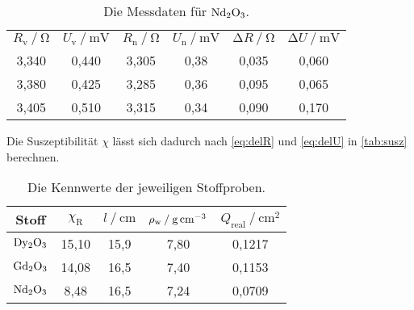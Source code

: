 \begin{table}[H]
  \centering
  \caption{Die Messdaten für $\ce{Nd2O3}$.}
  \label{tab:nd}
  \begin{tabular}{c c c c c c}
    \toprule 
    
    \multicolumn{1}{c}{$R_\text{v} \mathbin{/} \unit{\ohm} $} &
    \multicolumn{1}{c}{$U_\text{v} \mathbin{/} \unit{\milli\volt}$} &
    \multicolumn{1}{c}{$R_\text{n} \mathbin{/} \unit{\ohm}$}& 
    \multicolumn{1}{c}{$U_\text{n} \mathbin{/} \unit{\milli\volt}$} &
    \multicolumn{1}{c}{$\increment R \mathbin{/} \unit{\ohm}$}& 
    \multicolumn{1}{c}{$\increment U \mathbin{/} \unit{\milli\volt}$} \\

    \cmidrule(lr){1-2} \cmidrule(lr){3-4} \cmidrule(lr){5-6}

    3,340 & 0,440 & 3,305 & 0,38 &   0,035 &   0,060 \\
    3,380 & 0,425 & 3,285 & 0,36 &   0,095 &   0,065 \\
    3,405 & 0,510 & 3,315 & 0,34 &   0,090 &   0,170 \\
    \bottomrule
  \end{tabular} 
\end{table}




Die Suszeptibilität $\chi$ lässt sich dadurch nach \autoref{eq:delR} und \autoref{eq:delU} in \autoref{tab:susz} berechnen.
\begin{table}
  \centering
  \caption{Die Kennwerte der jeweiligen Stoffproben.}
  \label{tab:susz}
  \begin{tabular}{c c c c c}
    \toprule
    Stoff &   
    $\chi_\text{R}$ &
    $l \mathbin{/} \mathrm{cm}$ &
    $\rho_\text{w} \mathbin{/} \unit[per-mode=reciprocal]{\gram\per\cubic\centi\meter}$ & 
    $Q_\text{real} \mathbin{/} \unit{\centi\meter\squared}$ \\
    \midrule
    $\ce{Dy2O3}$ & 15,10 &  15,9 & 7,80 & 0,1217 \\
    $\ce{Gd2O3}$ & 14,08 &  16,5 & 7,40 & 0,1153 \\
    $\ce{Nd2O3}$ &  8,48 &  16,5 & 7,24 & 0,0709 \\
    \bottomrule
  \end{tabular}
\end{table}
